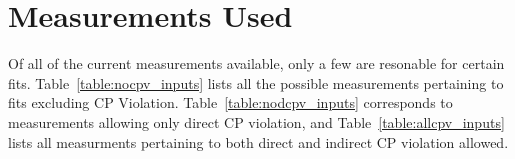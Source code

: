 \section{Measurements Used}
\label{sec:measurements}

Of all of the current measurements available, only a few are resonable
for certain fits. Table~\ref{table:nocpv_inputs} lists all the possible
 measurements pertaining to fits excluding CP Violation. Table~\ref{table:nodcpv_inputs}
corresponds to measurements allowing only direct CP violation, and 
Table~\ref{table:allcpv_inputs} lists all measurments pertaining to both
direct and indirect CP violation allowed.
%




